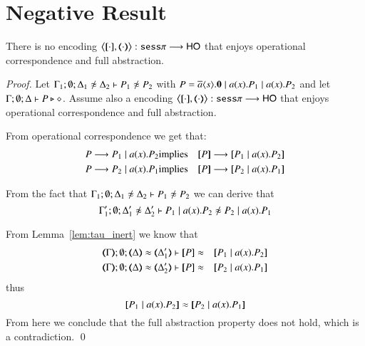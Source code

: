 \section{Negative Result}
\label{app:neg}

\begin{theorem}\rm
	There is no encoding $\enc{\cdot}{\cdot}: \sessp \longrightarrow \HO$
	that enjoys operational correspondence and full abstraction.
\end{theorem}

\begin{proof}
	Let $\Gamma_1; \emptyset; \Delta_1 \not\wb \Delta_2 \proves P_1 \not\wb P_2 $
	with $P = \overline{a} \langle s \rangle . \mathbf{0} \;|\; a (x) . P_1 \;|\; a (x) . P_2$ and
	let $\Gamma; \emptyset; \Delta \vdash P \triangleright \diamond$.
	Assume also a encoding
	$\enc{\cdot}{\cdot}: \sessp \longrightarrow \HO$
	that enjoys
	operational correspondence and full abstraction.

	From operational correspondence we get that:
	\begin{eqnarray*}
		P \red P_1 \Par \bacc{a}{x} P_2 &\textrm{implies}& \map{P} \red \map{P_1 \Par \bacc{a}{x} P_2}\\
		P \red P_2 \Par \bacc{a}{x} P_1 &\textrm{implies}& \map{P} \red \map{P_2 \Par \bacc{a}{x} P_1}
	\end{eqnarray*}

	From the fact that
	$\Gamma_1; \emptyset; \Delta_1 \not\wb \Delta_2 \proves P_1 \not\wb P_2$
	we can derive that
	\[
		\Gamma_1'; \emptyset; \Delta_1' \not\wb \Delta_2' \proves P_1 \Par \bacc{a}{x} P_2 \not\wb P_2 \Par \bacc{a}{x} P_1
	\]

	From Lemma~\ref{lem:tau_inert} we know that
	\begin{eqnarray*}
		\mapt{\Gamma}; \emptyset; \mapt{\Delta} \wb \mapt{\Delta_1'} \proves \map{P} &\wb& \map{P_1 \Par \bacc{a}{x} P_2}\\
		\mapt{\Gamma}; \emptyset; \mapt{\Delta} \wb \mapt{\Delta_2'} \proves \map{P} &\wb& \map{P_2 \Par \bacc{a}{x} P_1}
	\end{eqnarray*}
	\noi thus
	\[
		\map{P_1 \Par \bacc{a}{x} P_2} \wb \map{P_2 \Par \bacc{a}{x} P_1}
	\]
	From here we conclude that the full abstraction property does not hold,
	which is a contradiction.
	\qed
\end{proof}
